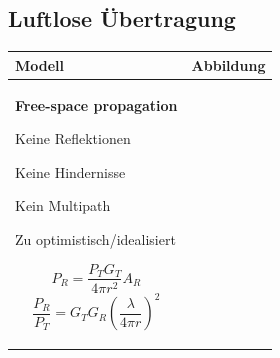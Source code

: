 \subsection{Luftlose Übertragung }
\begin{tabular}{|l|c|}
\hline
\textbf{Modell}
    & \textbf{Abbildung}\\
\hline
\hline
\parbox{10cm}{
    \textbf{Free-space propagation } \\
    \begin{minipage}{6cm}
	    \begin{liste}
	        \item Keine Reflektionen
	        \item Keine Hindernisse
	        \item Kein Multipath
	        \item Zu optimistisch/idealisiert
	    \end{liste}        
    \end{minipage}
    \begin{minipage}{3cm}
        $$ P_R= \frac{P_TG_T}{4\pi r^2} A_R $$
        $$ \frac{P_R}{P_T} = G_TG_R \left(\frac{\lambda}{4\pi r}\right)^2  $$
    \end{minipage}

}
\end{tabular}

